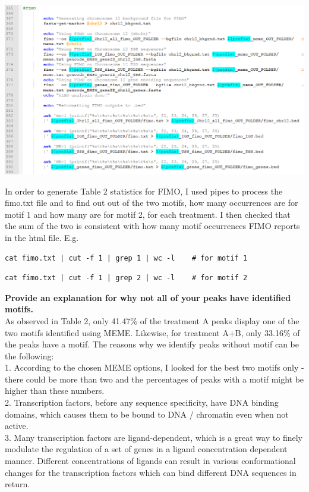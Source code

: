 \documentclass[a4paper,11pt]{article}
\begin{document}
\noindent \includegraphics[scale=0.75]{FIMO.PNG}


\noindent In order to generate Table 2 statistics for FIMO, I used pipes to process the fimo.txt file and to find out out of the two motifs, how many occurrences are for motif 1 and how many are for motif 2, for each treatment. I then checked that the sum of the two is consistent with how many motif occurrences FIMO reports in the html file. E.g.

\begin{verbatim}
cat fimo.txt | cut -f 1 | grep 1 | wc -l    # for motif 1
\end{verbatim}

\begin{verbatim}
cat fimo.txt | cut -f 1 | grep 2 | wc -l	# for motif 2
\end{verbatim}

\textbf{Provide an explanation for why not all of your peaks have identified motifs.}\\

\noindent As observed in Table 2, only 41.47\% of the treatment A peaks display one of the two motifs identified using MEME. Likewise, for treatment A+B, only 33.16\% of the peaks have a motif. The reasons why we identify peaks without motif can be the following:\\
1. According to the chosen MEME options, I looked for the best two motifs only - there could be more than two and the percentages of peaks with a motif might be higher than these numbers.\\
2. Transcription factors, before any sequence specificity, have DNA binding domains, which causes them to be bound to DNA / chromatin even when not active.\\
3. Many transcription factors are ligand-dependent, which is a great way to finely modulate the regulation of a set of genes in a ligand concentration dependent manner. Different concentrations of ligands can result in various conformational changes for the transcription factors which can bind different DNA sequences in return.\\
\end{document}
